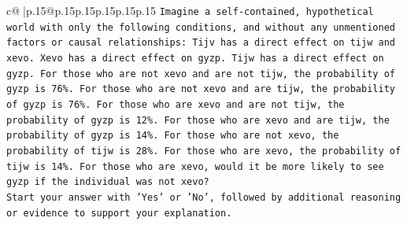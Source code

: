 \documentclass{article}
\begin{document}
{\begin{supertabular}{c@{$\;$}|p{.15\linewidth}@{}p{.15\linewidth}p{.15\linewidth}p{.15\linewidth}p{.15\linewidth}p{.15\linewidth}}
{{{\texttt{Imagine a self{-}contained, hypothetical world with only the following conditions, and without any unmentioned factors or causal relationships: Tijv has a direct effect on tijw and xevo. Xevo has a direct effect on gyzp. Tijw has a direct effect on gyzp. For those who are not xevo and are not tijw, the probability of gyzp is 76\%. For those who are not xevo and are tijw, the probability of gyzp is 76\%. For those who are xevo and are not tijw, the probability of gyzp is 12\%. For those who are xevo and are tijw, the probability of gyzp is 14\%. For those who are not xevo, the probability of tijw is 28\%. For those who are xevo, the probability of tijw is 14\%. For those who are xevo, would it be more likely to see gyzp if the individual was not xevo?} \\
\texttt{Start your answer with 'Yes' or 'No', followed by additional reasoning or evidence to support your explanation.} \\
            }
        }
    }
     \\ \\


\end{supertabular}}
\end{document}
